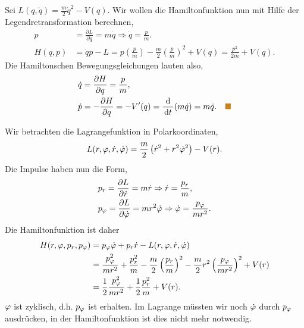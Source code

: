 \begin{bsp}
 Sei $L(q,\dot{q}) = \frac{m}{2}\dot{q}^2 - V(q)$. Wir wollen die
  Hamiltonfunktion nun mit Hilfe der Legendretransformation berechnen,
\begin{align*}
p &= \frac{\partial L}{\partial \dot{q}} = m\dot{q} \Rightarrow \dot{q} =
\frac{p}{m}.\\
H(q,p) &= \dot{q}p - L = p\left(\frac{p}{m}\right) -
\frac{m}{2}\left(\frac{p}{m}\right)^2 + V(q) = \frac{p^2}{2m} + V(q).
\end{align*}
Die Hamiltonschen Bewegungsgleichungen lauten also,
\begin{align*}
&\dot{q} = \frac{\partial H}{\partial q} = \frac{p}{m},\\
&\dot{p} = -\frac{\partial H}{\partial q} = - V'(q) =
\frac{\diffd}{\dt}(m\dot{q}) = m\ddot{q}.\bsphere
\end{align*}
\end{bsp}
\begin{bsp}
 Wir betrachten die Lagrangefunktion in Polarkoordinaten,
\begin{align*}
L(r,\varphi,\dot{r},\dot{\varphi}) = \frac{m}{2}\left(\dot{r}^2 + r^2 \dot{\varphi}^2
\right) - V(r).
\end{align*}
Die Impulse haben nun die Form,
\begin{align*}
&p_r = \frac{\partial L}{\partial \dot{r}} = m\dot{r} \Rightarrow \dot{r} =
\frac{p_r}{m},\\
&p_\varphi = \frac{\partial L}{\partial \dot{\varphi}} = mr^2\dot{\varphi} \Rightarrow
\dot{\varphi} = \frac{p_\varphi}{mr^2}.
\end{align*}
Die Hamiltonfunktion ist daher
\begin{align*}
H(r,\varphi,p_r,p_\varphi) &= p_\varphi \dot{\varphi} + p_r \dot{r} - L(r,\varphi,\dot{r},\dot{\varphi})
\\ &= \frac{p_\varphi^2}{mr^2} + \frac{p_r^2}{m} -
\frac{m}{2}\left(\frac{p_r}{m}\right)^2 -
\frac{m}{2}r^2\left(\frac{p_\varphi}{mr^2}\right)^2 + V(r)
\\ &= \frac{1}{2}\frac{p_\varphi^2}{mr^2} + \frac{1}{2}\frac{p_r^2}{m} + V(r).
\end{align*}
$\varphi$ ist zyklisch, d.h. $p_\varphi$ ist erhalten. Im Lagrange müssten wir noch
$\dot{\varphi}$ durch $p_\varphi$ ausdrücken, in der Hamiltonfunktion ist dies nicht
mehr notwendig.\bsphere
\end{bsp}
